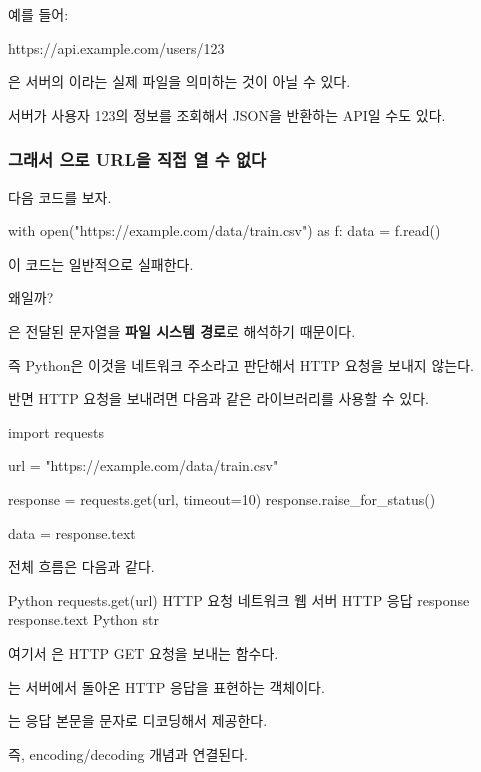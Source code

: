 예를 들어:

\begin{dhkzsh}
https://api.example.com/users/123
\end{dhkzsh}

은 서버의 이라는 실제 파일을 의미하는 것이 아닐 수 있다.

서버가 사용자 123의 정보를 조회해서 JSON을 반환하는 API일 수도 있다.

\subsubsection{그래서 으로 URL을 직접 열 수 없다}

다음 코드를 보자.

\begin{dhkcode}
with open("https://example.com/data/train.csv") as f:
    data = f.read()
\end{dhkcode}

이 코드는 일반적으로 실패한다.

왜일까?

은 전달된 문자열을 \textbf{파일 시스템 경로}로 해석하기 때문이다.

즉 Python은 이것을 네트워크 주소라고 판단해서 HTTP 요청을 보내지 않는다.

반면 HTTP 요청을 보내려면 다음과 같은 라이브러리를 사용할 수 있다.

\begin{dhkcode}
import requests

url = "https://example.com/data/train.csv"

response = requests.get(url, timeout=10)
response.raise_for_status()

data = response.text
\end{dhkcode}

전체 흐름은 다음과 같다.

\begin{dhksmry}[centered]
Python
\da
requests.get(url)
\da
HTTP 요청
\da
네트워크
\da
웹 서버
\da
HTTP 응답
\da
response
\da
response.text
\da
Python str
\end{dhksmry}

여기서 은 HTTP GET 요청을 보내는 함수다.

는 서버에서 돌아온 HTTP 응답을 표현하는 객체이다.

는 응답 본문을 문자로 디코딩해서 제공한다.

즉, encoding/decoding 개념과 연결된다.

